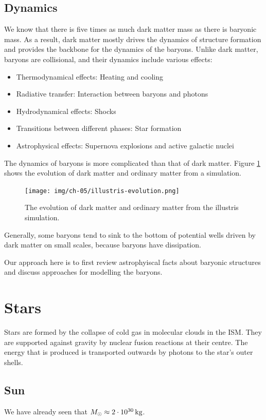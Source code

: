 \subsection{Dynamics}
We know that there is five times as much dark matter mass as there is baryonic mass.
As a result, dark matter mostly drives the dynamics of structure formation and provides the backbone for the dynamics of the baryons.
Unlike dark matter, baryons are collisional, and their dynamics include various effects:
\begin{itemize}
	\item Thermodynamical effects: Heating and cooling
	\item Radiative transfer: Interaction between baryons and photons
	\item Hydrodynamical effects: Shocks
	\item Transitions between different phases: Star formation
	\item Astrophysical effects: Supernova explosions and active galactic nuclei
\end{itemize}
The dynamics of baryons is more complicated than that of dark matter.
Figure \ref{fig:illustris-evolution} shows the evolution of dark matter and ordinary matter from a simulation.

\begin{figure}
	\texttt{[image: img/ch-05/illustris-evolution.png]}
	\caption{The evolution of dark matter and ordinary matter from the illustris simulation.}
	\label{fig:illustris-evolution}
\end{figure}

Generally, some baryons tend to sink to the bottom of potential wells driven by dark matter on small scales, because baryons have dissipation.

Our approach here is to first review astrophyiscal facts about baryonic structures and discuss approaches for modelling the baryons.





\section{Stars}

Stars are formed by the collapse of cold gas in molecular clouds in the ISM.
They are supported against gravity by nuclear fusion reactions at their centre.
The energy that is produced is transported outwards by photons to the star's outer shells.

\subsection{Sun}
We have already seen that $M_\sol \approx \SI{2e30}{\kg}$.


